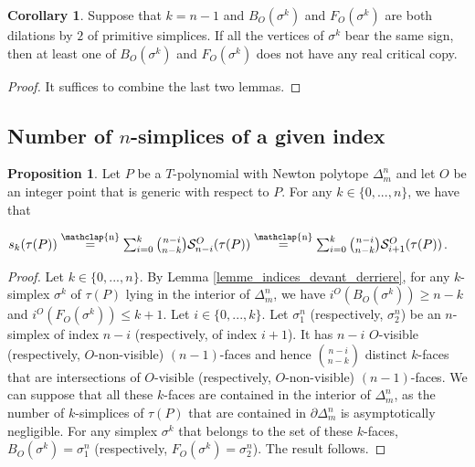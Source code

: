 \documentclass[12pt]{article}
\newcommand\customeq{\stackrel{\mathclap{\normalfont\scriptsize\mbox{n}}}{=}}
\theoremstyle{definition}
\newtheorem{prop}{Proposition}[section]
\newtheorem{cor}{Corollary}[section]
\begin{document}
\begin{cor}
    Suppose that $k = n-1$ and $B_O(\sigma^k)$ and $F_O(\sigma^k)$ are both dilations by $2$ of primitive simplices. If all the vertices of $\sigma^k$ bear the same sign, then at least one of $B_O(\sigma^k)$ and $F_O(\sigma^k)$ does not have any real critical copy.
\end{cor}

\begin{proof}
    It suffices to combine the last two lemmas.
\end{proof}

\subsection{Number of $n$-simplices of a given index}

\label{section_number_of_simplices_given_index}

\begin{prop}
    \label{prop_borne_indice_general}
    Let $P$ be a $T$-polynomial with Newton polytope $\Delta_m^n$ and let $O$ be an integer point that is generic with respect to $P$. For any $k \in \{0,...,n \}$, we have that
    \begin{center}
    $s_k(\tau(P)) \customeq \sum_{i=0}^k { n-i \choose n-k } \mathcal{S}_{n-i}^O(\tau(P)) \customeq \sum_{i=0}^k { n-i \choose n-k } \mathcal{S}_{i+1}^O(\tau(P))$.
    \end{center}
\end{prop}

\begin{proof}
    Let $k \in  \{0,...,n \}$. By Lemma \ref{lemme_indices_devant_derriere}, for any $k$-simplex $\sigma^k$ of $\tau(P)$ lying in the interior of $\Delta_m^n$, we have $i^O(B_O(\sigma^k))\geq n-k$ and $i^O(F_O(\sigma^k)) \leq k+1$.
    Let $i \in \{ 0,...,k \}$.
    Let $\sigma^n_1$ (respectively, $\sigma^n_2$) be an $n$-simplex of index $n-i$ (respectively, of index $i+1$). It has $n-i$ $O$-visible (respectively, $O$-non-visible) $(n-1)$-faces and hence ${ n-i \choose n-k }$ distinct $k$-faces that are intersections of $O$-visible (respectively, $O$-non-visible) $(n-1)$-faces. We can suppose that all these $k$-faces are contained in the interior of $\Delta_m^n$, as the number of $k$-simplices of $\tau(P)$ that are contained in $\partial \Delta_m^n$ is asymptotically negligible. For any simplex $\sigma^k$ that belongs to the set of these $k$-faces, $B_O(\sigma^k) = \sigma^n_1$ (respectively, $F_O(\sigma^k) = \sigma^n_2$). The result follows.
\end{proof}
\end{document}
